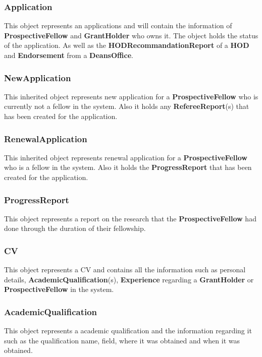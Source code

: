 \documentclass[12pt]{article}
\begin{document}
\subsubsection{Application}
This object represents an applications and will contain the information of \textbf{ProspectiveFellow} and \textbf{GrantHolder} who owns it. The object holds the status of the application. As well as the \textbf{HODRecommandationReport} of a \textbf{HOD} and \textbf{Endorsement} from a \textbf{DeansOffice}.

\subsubsection{NewApplication}
This inherited object represents new application for a \textbf{ProspectiveFellow} who is currently not a fellow in the system. Also it holds any \textbf{RefereeReport}(s) that has been created for the application.

\subsubsection{RenewalApplication}
This inherited object represents renewal application for a \textbf{ProspectiveFellow} who is a fellow in the system. Also it holds the \textbf{ProgressReport} that has been created for the application.

\subsubsection{ProgressReport}
This object represents a report on the research that the \textbf{ProspectiveFellow} had done through the duration of their fellowship.

\subsubsection{CV}
This object represents a CV and contains all the information such as personal details, \textbf{AcademicQualification}(s), \textbf{Experience} regarding a \textbf{GrantHolder} or \textbf{ProspectiveFellow} in the system.

\subsubsection{AcademicQualification}
This object represents a academic qualification and the information regarding it such as the qualification name, field, where it was obtained and when it was obtained.
\end{document}
